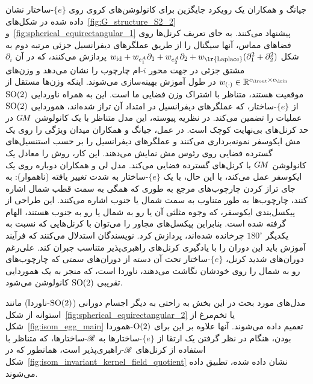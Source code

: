 جیانگ و همکاران\cite{jiang2019spherical}  یک رویکرد جایگزین برای کانولوشن‌های کروی روی $\{e\}$-ساختار نشان داده شده در شکل‌های~\ref{fig:G_structure_S2_2} و~\ref{fig:spherical_equirectangular_1} پیشنهاد می‌کنند.
به جای تعریف کرنل‌ها روی فضاهای مماس، آنها سیگنال را از طریق عملگرهای دیفرانسیل جزئی مرتبه دوم به شکل $w_{\id} + w_{e^A_1} \partial_1 + w_{e^A_2} \partial_2 + w_\textup{\lr{Laplace}} (\partial_1^2 + \partial_2^2)$ پردازش می‌کنند، که در آن $\partial_i$ مشتق جزئی در جهت محور $i$-ام چارچوب را نشان می‌دهد و وزن‌های $w_{(\cdot)} \in \R^{\cout\times\cin}$ در طول آموزش بهینه‌سازی می‌شوند.
اینکه وزن‌ها مستقل از موقعیت هستند، متناظر با اشتراک وزن فضایی ما است.
این به همراه ناوردایی $\operatorname{SO}(2)$ از $\{e\}$-ساختار، که عملگرهای دیفرانسیل در امتداد آن تراز شده‌اند، هموردایی $\operatorname{SO}(2)$ عملیات را تضمین می‌کند.
در نظریه پیوسته، این مدل متناظر با یک کانولوشن $G\mkern-1.4muM$ در حد کرنل‌های بی‌نهایت کوچک است.
در عمل، جیانگ و همکاران\cite{jiang2019spherical} میدان ویژگی را روی یک مش ایکوسفر نمونه‌برداری می‌کنند و عملگرهای دیفرانسیل را بر حسب استنسیل‌های گسترده فضایی روی رئوس مش نمایش می‌دهند.
این کار، روش را معادل یک کانولوشن $G\mkern-1.4muM$ با کرنل‌های گسترده فضایی می‌کند.
مدل لی و همکاران\cite{lee2019spherephd} دوباره روی یک ایکوسفر عمل می‌کند، با این حال، با یک $\{e\}$-ساختار به شدت تغییر یافته (ناهموار):
به جای تراز کردن چارچوب‌های مرجع به طوری که همگی به سمت قطب شمال اشاره کنند، چارچوب‌ها به طور متناوب به سمت شمال یا جنوب اشاره می‌کنند.
این طراحی از پیکسل‌بندی ایکوسفر، که وجوه مثلثی آن یا رو به شمال یا رو به جنوب هستند، الهام گرفته شده است.
بنابراین پیکسل‌های مجاور را می‌توان با کرنل‌هایی که نسبت به یکدیگر $180^\circ$ چرخانده شده‌اند، پردازش کرد.
نویسندگان استدلال می‌کنند که فرآیند آموزش باید این دوران را با یادگیری کرنل‌های راهبری‌پذیر متناسب جبران کند.
علی‌رغم دوران‌های شدید کرنل، $\{e\}$-ساختار تحت آن دسته از دوران‌های سمتی که چارچوب‌های رو به شمال را روی خودشان نگاشت می‌دهند، ناوردا است، که منجر به یک هموردایی تقریبی $\operatorname{SO}(2)$ کانولوشن می‌شود.


مدل‌های مورد بحث در این بخش به راحتی به دیگر اجسام دورانی ($\operatorname{SO}(2)$-ناوردا) مانند استوانه از شکل~\ref{fig:spherical_equirectangular_2} یا تخم‌مرغ از شکل~\ref{fig:isom_egg_main} تعمیم داده می‌شوند.
آنها علاوه بر این برای $\operatorname{O}(2)$-هموردا بودن، هنگام در نظر گرفتن یک ارتقا از $\{e\}$-ساختارها به $\mathscr{R}$-ساختارها، که متناظر با استفاده از کرنل‌های $\mathscr{R}$-راهبری‌پذیر است، همانطور که در شکل~\ref{fig:isom_invariant_kernel_field_quotient} نشان داده شده، تطبیق داده می‌شوند.